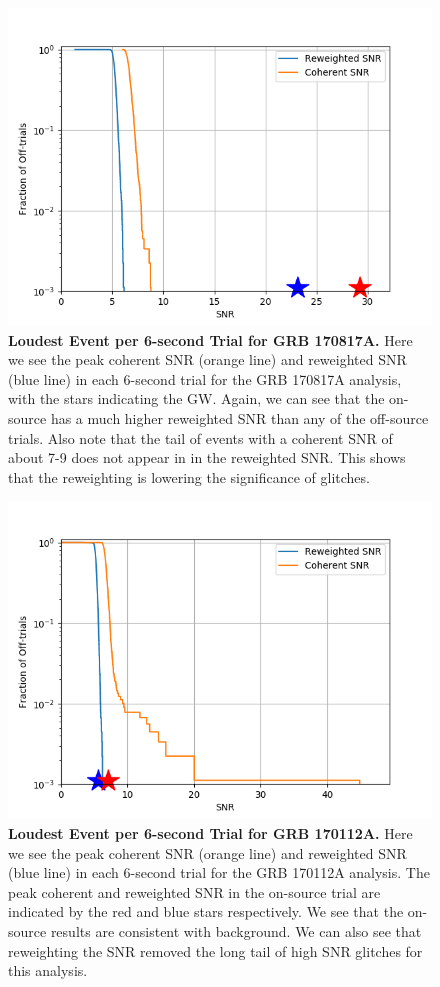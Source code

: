 \documentclass[11pt]{cuthesis}
\begin{document}
\begin{figure} %
\begin{center}
\includegraphics[width=0.8\linewidth]{binned_fap_with_signal_170817.png}
\end{center}
\caption{\textbf{Loudest Event per 6-second Trial for GRB 170817A.}  Here we see the peak coherent SNR (orange line) and reweighted SNR (blue line) in each 6-second trial for the GRB 170817A analysis, with the stars indicating the GW. Again, we can see that the on-source has a much higher reweighted SNR than any of the off-source trials. Also note that the tail of events with a coherent SNR of about 7-9 does not appear in in the reweighted SNR. This shows that the reweighting is lowering the significance of glitches.} 
\label{fig:snrs trials 170817}
\end{figure}

\begin{figure} %
\begin{center}
\includegraphics[width=0.8\linewidth]{binned_fap_with_signal_GRB170112A.png}
\end{center}
\caption{\textbf{Loudest Event per 6-second Trial for GRB 170112A.} Here we see the peak coherent SNR (orange line) and reweighted SNR (blue line) in each 6-second trial for the GRB 170112A analysis. The peak coherent and reweighted SNR in the on-source trial are indicated by the red and blue stars respectively. We see that the on-source results are consistent with background. We can also see that reweighting the SNR removed the long tail of high SNR glitches for this analysis. } 
\label{fig:snrs trials 170112A}
\end{figure}
\end{document}
